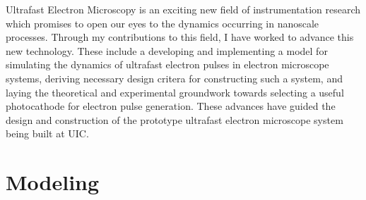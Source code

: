 
Ultrafast Electron Microscopy is an exciting new field of instrumentation research which promises to open our eyes to the dynamics occurring in nanoscale processes.
Through my contributions to this field, I have worked to advance this new technology.
These include a developing and implementing a model for simulating the dynamics of ultrafast electron pulses in electron microscope systems, deriving necessary design critera for constructing such a system, and laying the theoretical and experimental groundwork towards selecting a useful photocathode for electron pulse generation.
These advances have guided the design and construction of the prototype ultrafast electron microscope system being built at UIC.

\section{Modeling}

